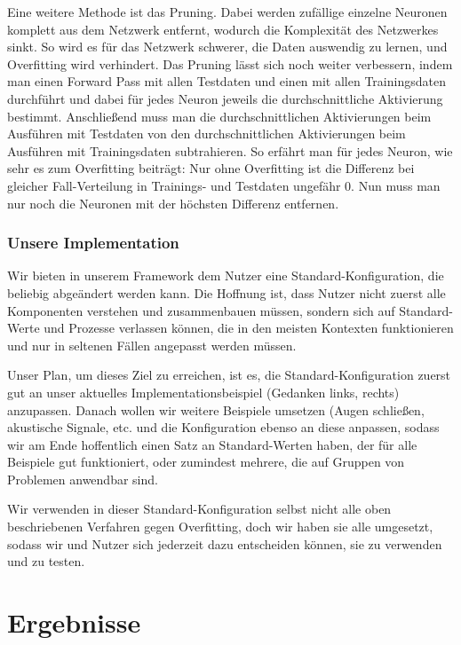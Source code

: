 \documentclass[10pt]{article}
\begin{document}
Eine weitere Methode ist das Pruning.
Dabei werden zufällige einzelne Neuronen komplett aus dem Netzwerk entfernt, wodurch die Komplexität des Netzwerkes sinkt. 
So wird es für das Netzwerk schwerer, die Daten auswendig zu lernen, und Overfitting wird verhindert.
Das Pruning lässt sich noch weiter verbessern, indem man einen Forward Pass mit allen Testdaten und einen mit allen Trainingsdaten durchführt und dabei für jedes Neuron jeweils die durchschnittliche Aktivierung bestimmt. Anschließend muss man die durchschnittlichen Aktivierungen beim Ausführen mit Testdaten von den durchschnittlichen Aktivierungen beim Ausführen mit Trainingsdaten subtrahieren.
So erfährt man für jedes Neuron, wie sehr es zum Overfitting beiträgt: Nur ohne Overfitting ist die Differenz bei gleicher Fall-Verteilung in Trainings- und Testdaten ungefähr 0.
Nun muss man nur noch die Neuronen mit der höchsten Differenz entfernen.

\subsubsection{Unsere Implementation} \label{section:UnsereImplementation}

Wir bieten in unserem Framework dem Nutzer eine Standard-Konfiguration, die beliebig abgeändert werden kann.
Die Hoffnung ist, dass Nutzer nicht zuerst alle Komponenten verstehen und zusammenbauen müssen, sondern sich auf Standard-Werte und Prozesse verlassen können, die in den meisten Kontexten funktionieren und nur in seltenen Fällen angepasst werden müssen.

Unser Plan, um dieses Ziel zu erreichen, ist es, die Standard-Konfiguration zuerst gut an unser aktuelles Implementationsbeispiel (Gedanken links, rechts) anzupassen.
Danach wollen wir weitere Beispiele umsetzen (Augen schließen, akustische Signale, etc. und die Konfiguration ebenso an diese anpassen, sodass wir am Ende hoffentlich einen Satz an Standard-Werten haben, der für alle Beispiele gut funktioniert, oder zumindest mehrere, die auf Gruppen von Problemen anwendbar sind.

Wir verwenden in dieser Standard-Konfiguration selbst nicht alle oben beschriebenen Verfahren gegen Overfitting, doch wir haben sie alle umgesetzt, sodass wir und Nutzer sich jederzeit dazu entscheiden können, sie zu verwenden und zu testen.

\section{Ergebnisse}
\end{document}
